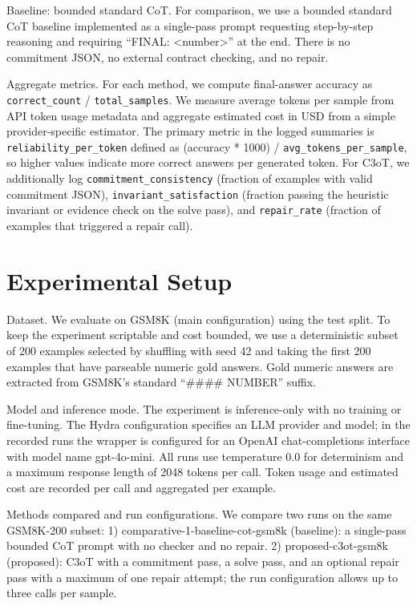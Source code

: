 \documentclass[journal,article,submit,pdftex,moreauthors]{Definitions/mdpi}
\begin{document}
Baseline: bounded standard CoT. For comparison, we use a bounded standard CoT baseline implemented as a single-pass prompt requesting step-by-step reasoning and requiring “FINAL: <number>” at the end. There is no commitment JSON, no external contract checking, and no repair.

Aggregate metrics. For each method, we compute final-answer accuracy as \texttt{correct\_count} / \texttt{total\_samples}. We measure average tokens per sample from API token usage metadata and aggregate estimated cost in USD from a simple provider-specific estimator. The primary metric in the logged summaries is \texttt{reliability\_per\_token} defined as (accuracy * 1000) / \texttt{avg\_tokens\_per\_sample}, so higher values indicate more correct answers per generated token. For C3oT, we additionally log \texttt{commitment\_consistency} (fraction of examples with valid commitment JSON), \texttt{invariant\_satisfaction} (fraction passing the heuristic invariant or evidence check on the solve pass), and \texttt{repair\_rate} (fraction of examples that triggered a repair call).

\section{Experimental Setup}

Dataset. We evaluate on GSM8K (main configuration) using the test split. To keep the experiment scriptable and cost bounded, we use a deterministic subset of 200 examples selected by shuffling with seed 42 and taking the first 200 examples that have parseable numeric gold answers. Gold numeric answers are extracted from GSM8K’s standard “#### NUMBER” suffix.

Model and inference mode. The experiment is inference-only with no training or fine-tuning. The Hydra configuration specifies an LLM provider and model; in the recorded runs the wrapper is configured for an OpenAI chat-completions interface with model name gpt-4o-mini. All runs use temperature 0.0 for determinism and a maximum response length of 2048 tokens per call. Token usage and estimated cost are recorded per call and aggregated per example.

Methods compared and run configurations. We compare two runs on the same GSM8K-200 subset:
1) comparative-1-baseline-cot-gsm8k (baseline): a single-pass bounded CoT prompt with no checker and no repair.
2) proposed-c3ot-gsm8k (proposed): C3oT with a commitment pass, a solve pass, and an optional repair pass with a maximum of one repair attempt; the run configuration allows up to three calls per sample.
\end{document}
